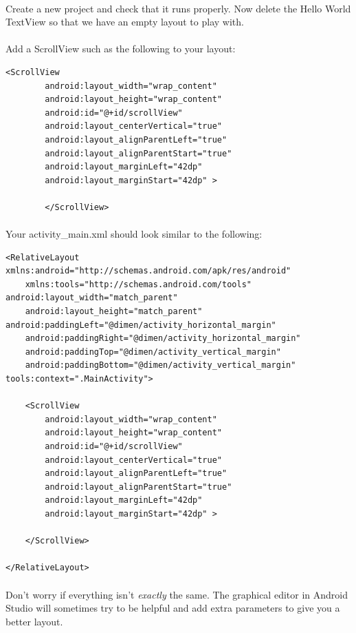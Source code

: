 \documentclass[12pt, a4paper, twoside]{book}
\begin{document}
\paragraph{} Create a new project and check that it runs properly. Now delete the Hello World TextView so that we have an empty layout to play with.

\paragraph{} Add a ScrollView such as the following to your layout:

\begin{lstlisting}
<ScrollView
        android:layout_width="wrap_content"
        android:layout_height="wrap_content"
        android:id="@+id/scrollView"
        android:layout_centerVertical="true"
        android:layout_alignParentLeft="true"
        android:layout_alignParentStart="true"
        android:layout_marginLeft="42dp"
        android:layout_marginStart="42dp" >

        </ScrollView>
\end{lstlisting}

\paragraph{} Your activity\_main.xml should look similar to the following:

\begin{lstlisting}
<RelativeLayout xmlns:android="http://schemas.android.com/apk/res/android"
    xmlns:tools="http://schemas.android.com/tools" android:layout_width="match_parent"
    android:layout_height="match_parent" android:paddingLeft="@dimen/activity_horizontal_margin"
    android:paddingRight="@dimen/activity_horizontal_margin"
    android:paddingTop="@dimen/activity_vertical_margin"
    android:paddingBottom="@dimen/activity_vertical_margin" tools:context=".MainActivity">

    <ScrollView
        android:layout_width="wrap_content"
        android:layout_height="wrap_content"
        android:id="@+id/scrollView"
        android:layout_centerVertical="true"
        android:layout_alignParentLeft="true"
        android:layout_alignParentStart="true"
        android:layout_marginLeft="42dp"
        android:layout_marginStart="42dp" >
         
    </ScrollView>

</RelativeLayout>
\end{lstlisting}
\paragraph{} Don't worry if everything isn't \emph{exactly} the same. The graphical editor in Android Studio will sometimes try to be helpful and add extra parameters to give you a better layout.
\end{document}

